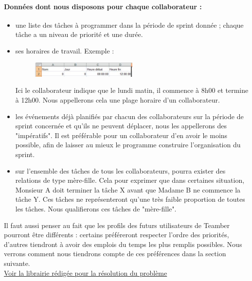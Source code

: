 \documentclass[12pt]{article}
\begin{document}
\paragraph{Données dont nous disposons pour chaque collaborateur :} 
\begin{itemize}
\item une liste des tâches à programmer dans la période de sprint donnée ; chaque tâche a un niveau de priorité et une durée. 
\item ses horaires de travail. Exemple :
\begin{figure}[H]
\begin{center}
\includegraphics[width=0.50\textwidth]{plagehoraire}
\end{center}
\end{figure}
Ici le collaborateur indique que le lundi matin, il commence à 8h00 et termine à 12h00. Nous appellerons cela une plage horaire d'un collaborateur.

\item les événements déjà planifiés par chacun des collaborateurs sur la période de sprint concernée et qu'ils ne peuvent déplacer, nous les appellerons des "impératifs". Il est préférable pour un collaborateur d'en avoir le moins possible, afin de laisser au mieux le programme construire l'organisation du sprint.

\item sur l'ensemble des tâches de tous les collaborateurs, pourra exister des relations de type mère-fille. Cela pour exprimer que dans certaines situation, Monsieur A doit terminer la tâche X avant que Madame B ne commence la tâche Y. Ces tâches ne représenteront qu'une très faible proportion de toutes les tâches. Nous qualifierons ces tâches de "mère-fille".



\end{itemize}

\medbreak

Il faut aussi penser au fait que les profils des futurs utilisateurs de Teamber pourront être différents : certains préféreront respecter l'ordre des priorités, d'autres tiendront à avoir des emplois du temps les plus remplis possibles. Nous verrons comment nous tiendrons compte de ces préférences dans la section suivante.\\

\hyperlink{ref13}{Voir la librairie rédigée pour la résolution du problème}
\hypertarget{ref14}{}
\newpage
\end{document}
